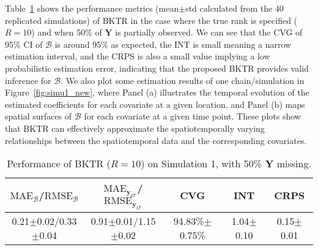 \documentclass[12pt]{article}
\begin{document}
Table~\ref{tab:simu1} shows the performance metrics (mean$\pm$std calculated from the 40 replicated simulations) of BKTR in the case where the true rank is specified ($R=10$) and when 50\% of $\boldsymbol{Y}$ is partially observed. We can see that the CVG of 95\% CI of $\boldsymbol{\mathcal{B}}$ is around 95\% as expected, the INT is small meaning a narrow estimation interval, and the CRPS is also a small value implying a low probabilistic estimation error, indicating that the proposed BKTR provides valid inference for $\boldsymbol{\mathcal{B}}$. We also plot some estimation results of one chain/simulation in Figure~\ref{fig:simu1_new}, where Panel (a) illustrates the temporal evolution of the estimated coefficients for each covariate at a given location, and Panel (b) maps spatial surfaces of $\boldsymbol{\mathcal{B}}$ for each covariate at a given time point. These plots show that BKTR can effectively approximate the spatiotemporally varying relationships between the spatiotemporal data and the corresponding covariates.




\begin{table}[!t]
\footnotesize
    \centering
    \caption{Performance of BKTR ($R=10$) on Simulation 1, with 50\% $\boldsymbol{Y}$ missing.}
    \begin{tabular}{ccccc}
    \toprule
    $\text{MAE}_{\boldsymbol{\mathcal{B}}}$/$\text{RMSE}_{\boldsymbol{\mathcal{B}}}$ & $\text{MAE}_{\boldsymbol{y}_{\Omega^c}}$/$\text{RMSE}_{\boldsymbol{y}_{\Omega^c}}$ & CVG & INT & CRPS \\
    \midrule
    0.21$\pm$0.02/0.33$\pm$0.04 & 0.91$\pm$0.01/1.15$\pm$0.02 & 94.83\%$\pm$0.75\% & 1.04$\pm$0.10 & 0.15$\pm$0.01 \\
    \bottomrule
    \end{tabular}
    \label{tab:simu1}
\end{table}
\end{document}
